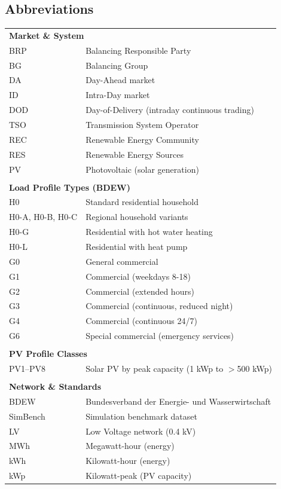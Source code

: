 \subsection{Abbreviations}

\begin{tabular}{ll}
\multicolumn{2}{l}{\textbf{Market \& System}} \\
BRP & Balancing Responsible Party \\
BG & Balancing Group \\
DA & Day-Ahead market \\
ID & Intra-Day market \\
DOD & Day-of-Delivery (intraday continuous trading) \\
TSO & Transmission System Operator \\
REC & Renewable Energy Community \\
RES & Renewable Energy Sources \\
PV & Photovoltaic (solar generation) \\
\\
\multicolumn{2}{l}{\textbf{Load Profile Types (BDEW)}} \\
H0 & Standard residential household \\
H0-A, H0-B, H0-C & Regional household variants \\
H0-G & Residential with hot water heating \\
H0-L & Residential with heat pump \\
G0 & General commercial \\
G1 & Commercial (weekdays 8-18) \\
G2 & Commercial (extended hours) \\
G3 & Commercial (continuous, reduced night) \\
G4 & Commercial (continuous 24/7) \\
G6 & Special commercial (emergency services) \\
\\
\multicolumn{2}{l}{\textbf{PV Profile Classes}} \\
PV1--PV8 & Solar PV by peak capacity (1 kWp to $>$500 kWp) \\
\\
\multicolumn{2}{l}{\textbf{Network \& Standards}} \\
BDEW & Bundesverband der Energie- und Wasserwirtschaft \\
SimBench & Simulation benchmark dataset \\
LV & Low Voltage network (0.4 kV) \\
MWh & Megawatt-hour (energy) \\
kWh & Kilowatt-hour (energy) \\
kWp & Kilowatt-peak (PV capacity) \\
\end{tabular}


